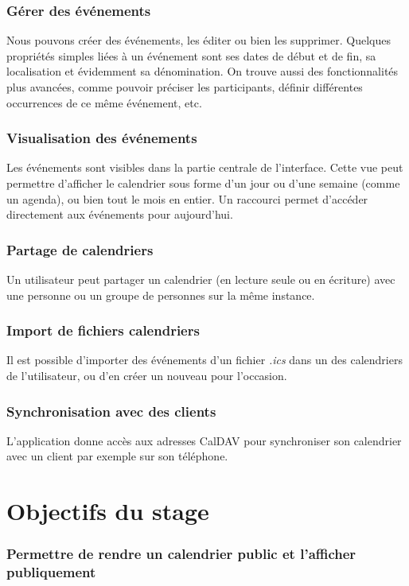 \documentclass[10pt,a4paper]{report}
\begin{document}
	\subsubsection{Gérer des événements}
	Nous pouvons créer des événements, les éditer ou bien les supprimer. Quelques propriétés simples liées à un événement sont ses dates de début et de fin, sa localisation et évidemment sa dénomination. On trouve aussi des fonctionnalités plus avancées, comme pouvoir préciser les participants, définir différentes occurrences de ce même événement, etc.
	
	\subsubsection{Visualisation des événements}
	Les événements sont visibles dans la partie centrale de l'interface. Cette vue peut permettre d'afficher le calendrier sous forme d'un jour ou d'une semaine (comme un agenda), ou bien tout le mois en entier. Un raccourci permet d'accéder directement aux événements pour aujourd’hui.
	
	\subsubsection{Partage de calendriers}
	Un utilisateur peut partager un calendrier (en lecture seule ou en écriture) avec une personne ou un groupe de personnes sur la même instance.
	
	\subsubsection{Import de fichiers calendriers}
	Il est possible d'importer des événements d'un fichier \textit{.ics} dans un des calendriers de l'utilisateur, ou d'en créer un nouveau pour l'occasion.
	
	\subsubsection{Synchronisation avec des clients}
	L'application donne accès aux adresses CalDAV pour synchroniser son calendrier avec un client par exemple sur son téléphone.
	
	\section{Objectifs du stage}
	
	\subsubsection{Permettre de rendre un calendrier public et l'afficher publiquement}
	
\end{document}
